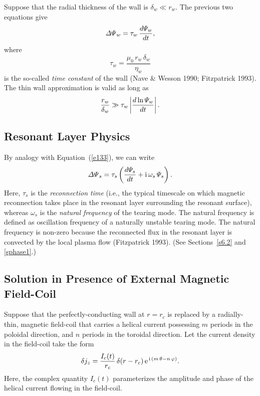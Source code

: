 \documentclass[notitlepage,12pt]{article}
\begin{document}
Suppose that the radial thickness of the wall is $\delta_w\ll r_w$. The previous two equations give
\begin{equation}\label{e133}
{\mit\Delta\Psi}_w = \tau_w\,\frac{d{\mit\Psi}_w}{dt},
\end{equation}
where
\begin{equation}
\tau_w = \frac{\mu_0\,r_w\,\delta_w}{\eta_w}
\end{equation}
is the so-called {\em time constant}\/ of the wall (Nave \& Wesson 1990; Fitzpatrick 1993). The thin wall approximation is
valid as long as
\begin{equation}
\frac{r_w}{\delta_w}\gg \tau_w\left|\frac{d\ln{\mit\Psi}_w}{dt}\right|.
\end{equation}

\subsection{Resonant Layer Physics}\label{sres}
By analogy with Equation~(\ref{e133}), we can write
\begin{equation}\label{e134}
{\mit\Delta\Psi}_s = \tau_s\left(\frac{d{\mit\Psi}_s}{dt} + {\rm i}\,\omega_s\,{\mit\Psi}_s\right).
\end{equation}
Here, $\tau_s$ is the {\em reconnection time}\/ (i.e., the typical timescale on which magnetic reconnection takes place in the
resonant layer surrounding the resonant surface), whereas $\omega_s$ is the {\em natural frequency}\/ of the tearing mode. The natural frequency is defined as oscillation frequency of a naturally unstable tearing mode. The
natural frequency  is non-zero because the reconnected flux in the resonant layer is convected by the local plasma
flow (Fitzpatrick 1993). (See Sections~\ref{s6.2} and \ref{sphase1}.)

\subsection{Solution in Presence of External Magnetic Field-Coil}\label{sfc}
Suppose that the perfectly-conducting wall at $r=r_c$ is replaced by a radially-thin, magnetic field-coil that carries a
helical current possessing $m$ periods in the poloidal direction, and $n$ periods in the toroidal direction. Let the current density in the field-coil
take the form
\begin{equation}\label{e135}
\delta j_z = \frac{I_c(t)}{r_c}\,\delta(r-r_c)\,{\rm e}^{\,{\rm i}\,(m\,\theta-n\,\varphi)}.
\end{equation}
Here, the complex quantity $I_c(t)$ parameterizes the amplitude and phase of the helical current flowing in the field-coil. 
\end{document}
